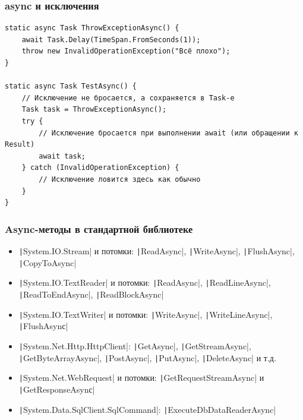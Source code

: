 \documentclass{../../slides-style}
\begin{document}
    \begin{frame}[fragile]
        \frametitle{async и исключения}
        \begin{footnotesize}
            \begin{verbatim}
static async Task ThrowExceptionAsync() {
    await Task.Delay(TimeSpan.FromSeconds(1));
    throw new InvalidOperationException("Всё плохо");
}

static async Task TestAsync() {
    // Исключение не бросается, а сохраняется в Task-е
    Task task = ThrowExceptionAsync();
    try {
        // Исключение бросается при выполнении await (или обращении к Result)
        await task;
    } catch (InvalidOperationException) {
        // Исключение ловится здесь как обычно
    }
}
            \end{verbatim}
        \end{footnotesize}
    \end{frame}

    \begin{frame}
        \frametitle{Async-методы в стандартной библиотеке}
        \begin{itemize}
            \item \texttt|System.IO.Stream| и потомки: \texttt|ReadAsync|, \texttt|WriteAsync|, \texttt|FlushAsync|, \texttt|CopyToAsync|
            \item \texttt|System.IO.TextReader| и потомки: \texttt|ReadAsync|, \texttt|ReadLineAsync|, \texttt|ReadToEndAsync|, \texttt|ReadBlockAsync|
            \item \texttt|System.IO.TextWriter| и потомки: \texttt|WriteAsync|, \texttt|WriteLineAsync|, \texttt|FlushAsynс|
            \item \texttt|System.Net.Http.HttpClient|: \texttt|GetAsync|, \texttt|GetStreamAsync|, \texttt|GetByteArrayAsync|, \texttt|PostAsync|, \texttt|PutAsync|, \texttt|DeleteAsync| и т.д.
            \item \texttt|System.Net.WebRequest| и потомки: \texttt|GetRequestStreamAsync| и \texttt|GetResponseAsynс|
            \item \texttt|System.Data.SqlClient.SqlCommand|: \texttt|ExecuteDbDataReaderAsync|
        \end{itemize}
    \end{frame}
\end{document}
